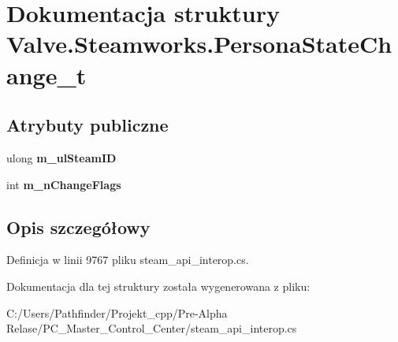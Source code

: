 \hypertarget{struct_valve_1_1_steamworks_1_1_persona_state_change__t}{}\section{Dokumentacja struktury Valve.\+Steamworks.\+Persona\+State\+Change\+\_\+t}
\label{struct_valve_1_1_steamworks_1_1_persona_state_change__t}
\subsection*{Atrybuty publiczne}
\begin{DoxyCompactItemize}
\item 
\mbox{\label{struct_valve_1_1_steamworks_1_1_persona_state_change__t_a07d3d83e1abc88ece2484ecfec909f2a}} 
ulong {\bfseries m\+\_\+ul\+Steam\+ID}
\item 
\mbox{\label{struct_valve_1_1_steamworks_1_1_persona_state_change__t_a1115654ea2993c2fc505c2fa45cba284}} 
int {\bfseries m\+\_\+n\+Change\+Flags}
\end{DoxyCompactItemize}


\subsection{Opis szczegółowy}


Definicja w linii 9767 pliku steam\+\_\+api\+\_\+interop.\+cs.



Dokumentacja dla tej struktury została wygenerowana z pliku\+:\begin{DoxyCompactItemize}
\item 
C\+:/\+Users/\+Pathfinder/\+Projekt\+\_\+cpp/\+Pre-\/\+Alpha Relase/\+P\+C\+\_\+\+Master\+\_\+\+Control\+\_\+\+Center/steam\+\_\+api\+\_\+interop.\+cs\end{DoxyCompactItemize}
